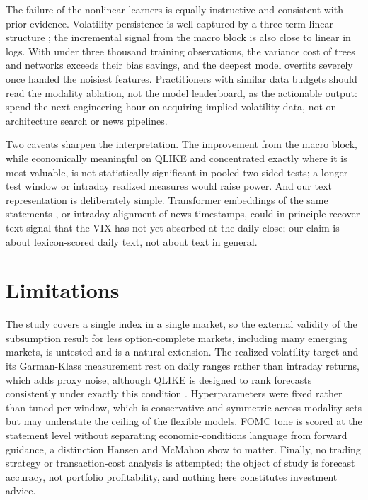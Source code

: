 \documentclass[10pt,twocolumn]{article}
\begin{document}
The failure of the nonlinear learners is equally instructive and consistent with prior evidence. Volatility persistence is well captured by a three-term linear structure \cite{corsi2009}; the incremental signal from the macro block is also close to linear in logs. With under three thousand training observations, the variance cost of trees and networks exceeds their bias savings, and the deepest model overfits severely once handed the noisiest features. Practitioners with similar data budgets should read the modality ablation, not the model leaderboard, as the actionable output: spend the next engineering hour on acquiring implied-volatility data, not on architecture search or news pipelines.

Two caveats sharpen the interpretation. The improvement from the macro block, while economically meaningful on QLIKE and concentrated exactly where it is most valuable, is not statistically significant in pooled two-sided tests; a longer test window or intraday realized measures would raise power. And our text representation is deliberately simple. Transformer embeddings of the same statements \cite{araci2019}, or intraday alignment of news timestamps, could in principle recover text signal that the VIX has not yet absorbed at the daily close; our claim is about lexicon-scored daily text, not about text in general.

\section{Limitations}
The study covers a single index in a single market, so the external validity of the subsumption result for less option-complete markets, including many emerging markets, is untested and is a natural extension. The realized-volatility target and its Garman-Klass measurement rest on daily ranges rather than intraday returns, which adds proxy noise, although QLIKE is designed to rank forecasts consistently under exactly this condition \cite{patton2011}. Hyperparameters were fixed rather than tuned per window, which is conservative and symmetric across modality sets but may understate the ceiling of the flexible models. FOMC tone is scored at the statement level without separating economic-conditions language from forward guidance, a distinction Hansen and McMahon \cite{hansen2016} show to matter. Finally, no trading strategy or transaction-cost analysis is attempted; the object of study is forecast accuracy, not portfolio profitability, and nothing here constitutes investment advice.
\end{document}
